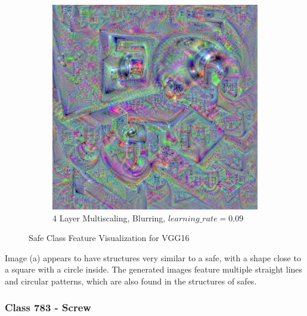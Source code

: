 \begin{figure}
\begin{subfigure}[t]{0.31\textwidth}
    \end{subfigure}
    \hfill
    \begin{subfigure}[t]{0.31\textwidth}
        \captionsetup{justification=centering}
        \centering
        \includegraphics[width=.7\linewidth]{figuras/feat_vis/experiments/classes/cl771/random_image_ci771_lr9e-2_pl4.png}
        \caption{4 Layer Multiscaling, Blurring, \(learning\_rate = 0.09\)}
    \end{subfigure}

    \caption{Safe Class Feature Visualization for VGG16}
    \label{fig:class_safe}
\end{figure}

Image (a) appears to have structures very similar to a safe, with a shape close to a square with a circle inside.
The generated images feature multiple straight lines and circular patterns, which are also found in the structures of safes.

\subsubsection{Class 783 - Screw}

